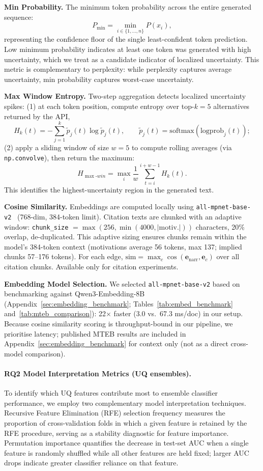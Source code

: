 \noindent\textbf{Min Probability.} The minimum token probability across the entire generated sequence:
\[
P_{\min} = \min_{i \in \{1,\ldots,n\}} P(x_i),
\]
representing the confidence floor of the single least-confident token prediction. Low minimum probability indicates at least one token was generated with high uncertainty, which we treat as a candidate indicator of localized uncertainty. This metric is complementary to perplexity: while perplexity captures average uncertainty, min probability captures worst-case uncertainty.

\noindent\textbf{Max Window Entropy.} Two-step aggregation detects localized uncertainty spikes: (1) at each token position, compute entropy over top-\(k{=}5\) alternatives returned by the API,
\[
H_k(t)=-\sum_{j=1}^{k}\tilde{p}_j(t)\log \tilde{p}_j(t),
\qquad
\tilde{p}_j(t)=\mathrm{softmax}(\mathrm{logprob}_j(t));
\]
(2) apply a sliding window of size \(w{=}5\) to compute rolling averages (via \texttt{np.convolve}), then return the maximum:
\[
H_{\max\text{-}win}=\max_{i}\frac{1}{w}\sum_{t=i}^{i+w-1} H_k(t).
\]
This identifies the highest-uncertainty region in the generated text.

\noindent\textbf{Cosine Similarity.}
\label{sec:uq_cossim}
Embeddings are computed locally using \texttt{all-mpnet-base-v2}~\cite{muennighoff2023mteb} (768-dim, 384-token limit). Citation texts are chunked with an adaptive window: \texttt{chunk\_size} \(=\max(256,\min(4000,|\text{motiv.}|))\) characters, 20\% overlap, de-duplicated. This adaptive sizing ensures chunks remain within the model's 384-token context (motivations average 56 tokens, max 137; implied chunks 57--176 tokens). For each edge, \(\mathrm{sim}=\max_c \cos(\mathbf{e}_{\mathrm{narr}},\mathbf{e}_c)\) over all citation chunks. Available only for citation experiments.

\noindent\textbf{Embedding Model Selection.} We selected \texttt{all-mpnet-base-v2} based on benchmarking against Qwen3-Embedding-8B (Appendix~\ref{sec:embedding_benchmark}; Tables~\ref{tab:embed_benchmark} and~\ref{tab:mteb_comparison}): 22$\times$ faster (3.0 vs.\ 67.3 ms/doc) in our setup. Because cosine similarity scoring is throughput-bound in our pipeline, we prioritise latency; published MTEB results are included in Appendix~\ref{sec:embedding_benchmark} for context only (not as a direct cross-model comparison).

\paragraph{RQ2 Model Interpretation Metrics (UQ ensembles).}
To identify which UQ features contribute most to ensemble classifier performance, we employ two complementary model interpretation techniques. Recursive Feature Elimination (RFE) selection frequency measures the proportion of cross-validation folds in which a given feature is retained by the RFE procedure, serving as a stability diagnostic for feature importance. Permutation importance quantifies the decrease in test-set AUC when a single feature is randomly shuffled while all other features are held fixed; larger AUC drops indicate greater classifier reliance on that feature.

